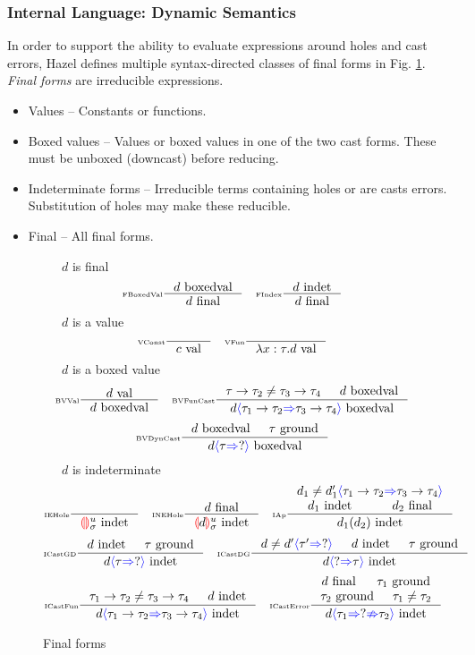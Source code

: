 \subsubsection{Internal Language: Dynamic Semantics}
In order to support the ability to evaluate expressions around holes and cast errors, Hazel defines multiple syntax-directed classes of final forms in Fig. \ref{fig:finalforms}. \textit{Final forms} are irreducible expressions.
\begin{itemize}
\item Values -- Constants or functions.
\item Boxed values -- Values or boxed values in one of the two cast forms. These must be unboxed (downcast) before reducing.
\item Indeterminate forms -- Irreducible terms containing holes or are casts errors. Substitution of holes may make these reducible.
\item Final -- All final forms.
\end{itemize}

\begin{figure}[H]
\small
\fbox{$\final$}\ \ \ $d$ is final
\tiny
\[\inference[\tiny FBoxedVal]{\boxedval}{\final}\quad
\inference[\tiny FIndex]{\indet}{\final}\]
\small
\fbox{$\val$}\ \ \ $d$ is a value
\tiny
\[\inference[\tiny VConst]{}{\val[c]}\quad
\inference[\tiny VFun]{}{\val[\lambda x:\tau. d]}\]
\small
\fbox{$\boxedval$}\ \ \ $d$ is a boxed value
\tiny
\[\inference[\tiny BVVal]{\val}{\boxedval}\quad
\inference[\tiny BVFunCast]{\tau \to \tau_2 \neq \tau_3 \to \tau_4 & \boxedval}{\boxedval[d\scast{\tau_1 \to \tau_2}{\tau_3 \to \tau_4}]}\]
\[\inference[\tiny BVDynCast]{\boxedval & \ground}{\boxedval[d\scast{\tau}{?}]}\]
\small
\fbox{$\indet$}\ \ \ $d$ is indeterminate
\tiny
\[\inference[\tiny IEHole]{}{\indet[\hole^u_\sigma]}\quad
\inference[\tiny INEHole]{\final}{\indet[{\hole[d]^u_\sigma}]}\quad
\inference[\tiny IAp]{d_1 \neq d_1'\scast{\tau_1 \to \tau_2}{\tau_3 \to \tau_4} \\ \indet[d_1] & \final[d_2]}{\indet[d_1(d_2)]}\]
\[\inference[\tiny ICastGD]{\indet & \ground}{\indet[d\scast{\tau}{?}]}\quad
\inference[\tiny ICastDG]{d \neq d'\scast{\tau'}{?} & \indet & \ground}{\indet[d\scast{?}{\tau}]}\]
\[\inference[\tiny ICastFun]{\tau_1 \to \tau_2 \neq \tau_3 \to \tau_4 & \indet}{\indet[d\scast{\tau_1 \to \tau_2}{\tau_3 \to \tau_4}]}\quad
\inference[\tiny ICastError]{\final & \ground[\tau_1] \\ \ground[\tau_2] & \tau_1 \neq \tau_2}{\indet[d\scasterror{\tau_1}{\tau_2}]}\]

\caption{Final forms}
\label{fig:finalforms}
\end{figure}


